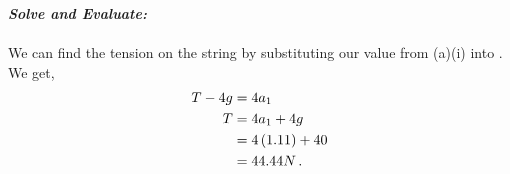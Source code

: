 \begin{subquestions}
\begin{subsubquestions}
	
	\subsubquestion
	
	\textbf{\textit{Solve and Evaluate:}} \\ \\
	We can find the tension on the string by substituting our value from (a)(i) into . We get,
	\begin{align}
		T-4g & = 4a_1 \nonumber \\
		T & = 4a_1 + 4g \nonumber \\
		& = 4\left(1.11 \right) + 40 \nonumber \\
		& = 44.44N \,.
	\end{align}

\end{subsubquestions}

\end{subquestions}